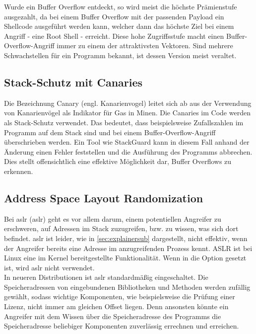 Wurde ein Buffer Overflow entdeckt, so wird meist die höchste Prämienstufe ausgezahlt, da bei einem
Buffer Overflow mit der passenden Payload ein Shellcode ausgeführt werden kann, welcher dann das
höchste Ziel bei einem Angriff - eine Root Shell - erreicht.
Diese hohe Zugriffsstufe macht einen Buffer-Overflow-Angriff immer zu einem der attraktivsten Vektoren. 
Sind mehrere Schwachstellen für ein Programm bekannt, ist dessen Version meist veraltet. 

\pagebreak
\subsection{Stack-Schutz mit Canaries} \label{sec:canaries}
Die Bezeichnung Canary (engl. Kanarienvogel) leitet sich ab aus der Verwendung von Kanarienvögel als
Indikator für Gas in Minen. Die Canaries im Code werden als Stack-Schutz verwendet. Das bedeutet,
dass beispielsweise Zufallszahlen im Programm auf dem Stack sind und bei einem Buffer-Overflow-Angriff
überschrieben werden. Ein Tool wie StackGuard kann in diesem Fall anhand der Änderung einen Fehler feststellen und
die Ausführung des Programms abbrechen. Dies stellt offensichtlich eine effektive Möglichkeit dar,
Buffer Overflows zu erkennen.

\subsection{Address Space Layout Randomization} \label{sec:aslr}
Bei \acrlong*{aslr} (\acrshort*{aslr}) geht es vor allem darum, einem potentiellen Angreifer zu erschweren,
auf Adressen im Stack zuzugreifen, bzw. zu wissen, was sich dort befindet.
\gls*{aslr} ist leider, wie in \autoref{sec:explainersub} dargestellt, nicht effektiv, wenn der Angreifer
bereits eine Adresse im anzugreifenden Prozess kennt.
ASLR ist bei Linux eine im Kernel bereitgestellte Funktionalität.
Wenn in  die Option  gesetzt ist,
wird \gls*{aslr}  nicht verwendet. \cite{aslrandrew} \\
In neueren Distributionen ist \gls*{aslr} standardmäßig eingeschaltet.
Die Speicheradressen von eingebundenen Bibliotheken und Methoden werden
zufällig gewählt, sodass wichtige Komponenten, wie beispielsweise die
Prüfung einer Lizenz, nicht immer am gleichen Offset liegen. Denn ansonsten könnte ein Angreifer
mit dem Wissen über die Speicheradresse des Programms die Speicheradresse beliebiger
Komponenten zuverlässig errechnen und erreichen.

